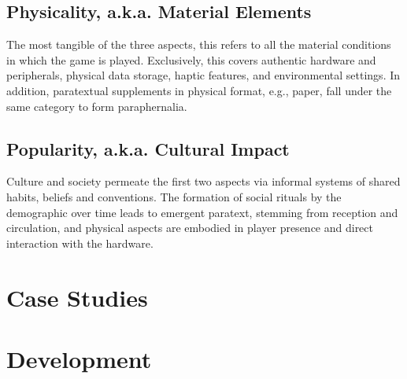 \documentclass[12pt,oneside]{book}
\begin{document}
\section{Physicality, a.k.a. Material Elements}
    The most tangible of the three aspects, this refers to all the material conditions in which the game is played.
    Exclusively, this covers authentic hardware and peripherals, physical data storage, haptic features, and environmental settings.
    In addition, paratextual supplements in physical format, e.g., paper, fall under the same category to form paraphernalia.
\section{Popularity, a.k.a. Cultural Impact}
    Culture and society permeate the first two aspects via informal systems of shared habits, beliefs and conventions.
    The formation of social rituals by the demographic over time leads to emergent paratext, stemming from reception and circulation, and physical aspects are embodied in player presence and direct interaction with the hardware.

\chapter{Case Studies}
    \vfill
    \vfill

\chapter{Development}\vspace{-1cm}
        \vfill
\end{document}
